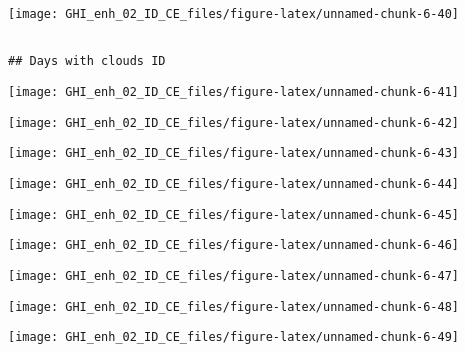 \documentclass[
  10pt,
  a4paper,oneside]{article}
\begin{document}
\begin{center}\texttt{[image: GHI\_enh\_02\_ID\_CE\_files/figure-latex/unnamed-chunk-6-40]} \end{center}

\begin{verbatim}

## Days with clouds ID 
\end{verbatim}

\begin{center}\texttt{[image: GHI\_enh\_02\_ID\_CE\_files/figure-latex/unnamed-chunk-6-41]} \end{center}

\begin{center}\texttt{[image: GHI\_enh\_02\_ID\_CE\_files/figure-latex/unnamed-chunk-6-42]} \end{center}

\begin{center}\texttt{[image: GHI\_enh\_02\_ID\_CE\_files/figure-latex/unnamed-chunk-6-43]} \end{center}

\begin{center}\texttt{[image: GHI\_enh\_02\_ID\_CE\_files/figure-latex/unnamed-chunk-6-44]} \end{center}

\begin{center}\texttt{[image: GHI\_enh\_02\_ID\_CE\_files/figure-latex/unnamed-chunk-6-45]} \end{center}

\begin{center}\texttt{[image: GHI\_enh\_02\_ID\_CE\_files/figure-latex/unnamed-chunk-6-46]} \end{center}

\begin{center}\texttt{[image: GHI\_enh\_02\_ID\_CE\_files/figure-latex/unnamed-chunk-6-47]} \end{center}

\begin{center}\texttt{[image: GHI\_enh\_02\_ID\_CE\_files/figure-latex/unnamed-chunk-6-48]} \end{center}

\begin{center}\texttt{[image: GHI\_enh\_02\_ID\_CE\_files/figure-latex/unnamed-chunk-6-49]} \end{center}
\end{document}
